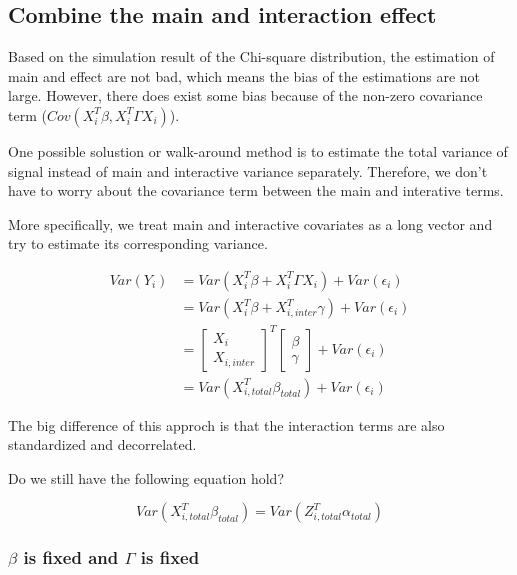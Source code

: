 \documentclass[]{article}
\begin{document}
\newpage

\subsection{Combine the main and interaction
effect}\label{combine-the-main-and-interaction-effect}

Based on the simulation result of the Chi-square distribution, the
estimation of main and effect are not bad, which means the bias of the
estimations are not large. However, there does exist some bias because
of the non-zero covariance term (\(Cov(X_i^T\beta, X_i^T\Gamma X_i)\)).

One possible solustion or walk-around method is to estimate the total
variance of signal instead of main and interactive variance separately.
Therefore, we don't have to worry about the covariance term between the
main and interative terms.

More specifically, we treat main and interactive covariates as a long
vector and try to estimate its corresponding variance.

\begin{align*}
  Var(Y_i) &= Var(X_i^T\beta + X_i^T \Gamma X_i) + Var(\epsilon_i) \\
           &= Var(X_i^T\beta + X_{i,inter}^T \gamma) + Var(\epsilon_i) \\
           &= \begin{bmatrix}   
                  X_i \\        
                  X_{i,inter}   
              \end{bmatrix}^T     
              \begin{bmatrix}
                \beta \\
                \gamma
              \end{bmatrix} + Var(\epsilon_i) \\
           &= Var(X_{i,total}^T \beta_{total}) + Var(\epsilon_i)
\end{align*}

The big difference of this approch is that the interaction terms are
also standardized and decorrelated.

Do we still have the following equation hold?

\[
  Var(X_{i,total}^T \beta_{total}) =  Var(Z_{i,total}^T \alpha_{total}) 
\]

\newpage

\subsubsection{\texorpdfstring{\(\beta\) is fixed and \(\Gamma\) is
fixed}{\textbackslash{}beta is fixed and \textbackslash{}Gamma is fixed}}\label{beta-is-fixed-and-gamma-is-fixed-2}
\end{document}
